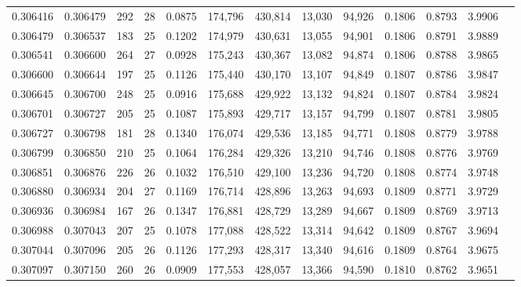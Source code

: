 \begin{tabular}{rrrrrrrrrrrrr}
0.306416 & 0.306479 &   292 &  28 &                                     0.0875 & 174,796 & 430,814 &  13,030 &  94,926 & 0.1806 & 0.8793 & 3.9906 \\
0.306479 & 0.306537 &   183 &  25 &                                     0.1202 & 174,979 & 430,631 &  13,055 &  94,901 & 0.1806 & 0.8791 & 3.9889 \\
0.306541 & 0.306600 &   264 &  27 &                                     0.0928 & 175,243 & 430,367 &  13,082 &  94,874 & 0.1806 & 0.8788 & 3.9865 \\
0.306600 & 0.306644 &   197 &  25 &                                     0.1126 & 175,440 & 430,170 &  13,107 &  94,849 & 0.1807 & 0.8786 & 3.9847 \\
0.306645 & 0.306700 &   248 &  25 &                                     0.0916 & 175,688 & 429,922 &  13,132 &  94,824 & 0.1807 & 0.8784 & 3.9824 \\
0.306701 & 0.306727 &   205 &  25 &                                     0.1087 & 175,893 & 429,717 &  13,157 &  94,799 & 0.1807 & 0.8781 & 3.9805 \\
0.306727 & 0.306798 &   181 &  28 &                                     0.1340 & 176,074 & 429,536 &  13,185 &  94,771 & 0.1808 & 0.8779 & 3.9788 \\
0.306799 & 0.306850 &   210 &  25 &                                     0.1064 & 176,284 & 429,326 &  13,210 &  94,746 & 0.1808 & 0.8776 & 3.9769 \\
0.306851 & 0.306876 &   226 &  26 &                                     0.1032 & 176,510 & 429,100 &  13,236 &  94,720 & 0.1808 & 0.8774 & 3.9748 \\
0.306880 & 0.306934 &   204 &  27 &                                     0.1169 & 176,714 & 428,896 &  13,263 &  94,693 & 0.1809 & 0.8771 & 3.9729 \\
0.306936 & 0.306984 &   167 &  26 &                                     0.1347 & 176,881 & 428,729 &  13,289 &  94,667 & 0.1809 & 0.8769 & 3.9713 \\
0.306988 & 0.307043 &   207 &  25 &                                     0.1078 & 177,088 & 428,522 &  13,314 &  94,642 & 0.1809 & 0.8767 & 3.9694 \\
0.307044 & 0.307096 &   205 &  26 &                                     0.1126 & 177,293 & 428,317 &  13,340 &  94,616 & 0.1809 & 0.8764 & 3.9675 \\
0.307097 & 0.307150 &   260 &  26 &                                     0.0909 & 177,553 & 428,057 &  13,366 &  94,590 & 0.1810 & 0.8762 & 3.9651 \\

\end{tabular}
